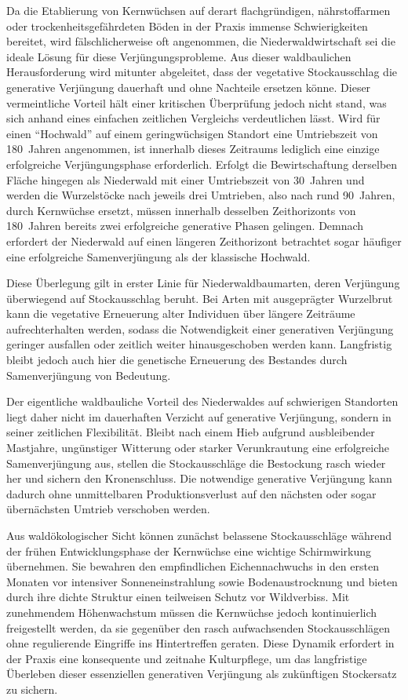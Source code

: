 \documentclass[twocolumn, bibliography=totoc, abstract=true]{scrartcl}
\begin{document}
Da die Etablierung von Kernwüchsen auf derart flachgründigen, nährstoffarmen oder trockenheitsgefährdeten Böden in der Praxis immense Schwierigkeiten bereitet, wird fälschlicherweise oft angenommen, die Niederwaldwirtschaft sei die ideale Lösung für diese Verjüngungsprobleme. Aus dieser waldbaulichen Herausforderung wird mitunter abgeleitet, dass der vegetative Stockausschlag die generative Verjüngung dauerhaft und ohne Nachteile ersetzen könne. Dieser vermeintliche Vorteil hält einer kritischen Überprüfung jedoch nicht stand, was sich anhand eines einfachen zeitlichen Vergleichs verdeutlichen lässt. Wird für einen "`Hochwald"' auf einem geringwüchsigen Standort eine Umtriebszeit von 180~Jahren angenommen, ist innerhalb dieses Zeitraums lediglich eine einzige erfolgreiche Verjüngungsphase erforderlich. Erfolgt die Bewirtschaftung derselben Fläche hingegen als Niederwald mit einer Umtriebszeit von 30~Jahren und werden die Wurzelstöcke nach jeweils drei Umtrieben, also nach rund 90~Jahren, durch Kernwüchse ersetzt, müssen innerhalb desselben Zeithorizonts von 180~Jahren bereits zwei erfolgreiche generative Phasen gelingen. Demnach erfordert der Niederwald auf einen längeren Zeithorizont betrachtet sogar häufiger eine erfolgreiche Samenverjüngung als der klassische Hochwald.

Diese Überlegung gilt in erster Linie für Niederwaldbaumarten, deren Verjüngung überwiegend auf Stockausschlag beruht. Bei Arten mit ausgeprägter Wurzelbrut kann die vegetative Erneuerung alter Individuen über längere Zeiträume aufrechterhalten werden, sodass die Notwendigkeit einer generativen Verjüngung geringer ausfallen oder zeitlich weiter hinausgeschoben werden kann. Langfristig bleibt jedoch auch hier die genetische Erneuerung des Bestandes durch Samenverjüngung von Bedeutung.

Der eigentliche waldbauliche Vorteil des Niederwaldes auf schwierigen Standorten liegt daher nicht im dauerhaften Verzicht auf generative Verjüngung, sondern in seiner zeitlichen Flexibilität. Bleibt nach einem Hieb aufgrund ausbleibender Mastjahre, ungünstiger Witterung oder starker Verunkrautung eine erfolgreiche Samenverjüngung aus, stellen die Stockausschläge die Bestockung rasch wieder her und sichern den Kronenschluss. Die notwendige generative Verjüngung kann dadurch ohne unmittelbaren Produktionsverlust auf den nächsten oder sogar übernächsten Umtrieb verschoben werden.

Aus waldökologischer Sicht können zunächst belassene Stockausschläge während der frühen Entwicklungsphase der Kernwüchse eine wichtige Schirmwirkung übernehmen. Sie bewahren den empfindlichen Eichennachwuchs in den ersten Monaten vor intensiver Sonneneinstrahlung sowie Bodenaustrocknung und bieten durch ihre dichte Struktur einen teilweisen Schutz vor Wildverbiss. Mit zunehmendem Höhenwachstum müssen die Kernwüchse jedoch kontinuierlich freigestellt werden, da sie gegenüber den rasch aufwachsenden Stockausschlägen ohne regulierende Eingriffe ins Hintertreffen geraten. Diese Dynamik erfordert in der Praxis eine konsequente und zeitnahe Kulturpflege, um das langfristige Überleben dieser essenziellen generativen Verjüngung als zukünftigen Stockersatz zu sichern.
\end{document}
